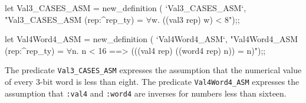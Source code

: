 \begintt
let Val3_CASES_ASM = new_definition (
  `Val3_CASES_ASM`,
  "Val3_CASES_ASM (rep:^rep_ty) = \(\forall\)w. ((val3 rep) w) < 8");;

let Val4Word4_ASM = new_definition (
  `Val4Word4_ASM`,
  "Val4Word4_ASM (rep:^rep_ty) =
   \(\forall\)n. n < 16 ==> (((val4 rep) ((word4 rep) n)) = n)");;
\endtt

The predicate \verb"Val3_CASES_ASM" expresses the assumption
that the numerical value of
every 3-bit word is less than eight.
The predicate \verb"Val4Word4_ASM" expresses the assumption
that \verb":val4" and \verb":word4" are inverses for numbers
less than sixteen.
